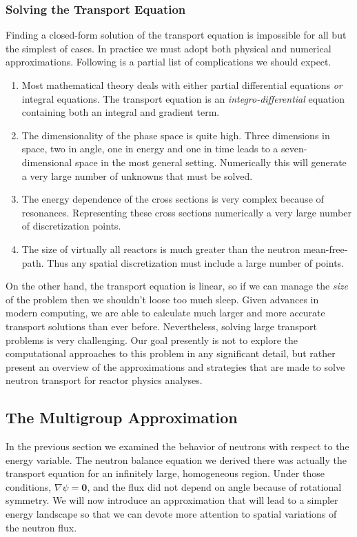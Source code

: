 \documentclass[11pt]{article}
\renewcommand\vec{\mathbf}
\begin{document}
\subsubsection{Solving the Transport Equation}
\label{sec:orgheadline50}
Finding a closed-form solution of the transport equation is impossible for all but the simplest of cases.  In practice we must adopt both physical and numerical approximations.  Following is a partial list of complications we should expect.
\begin{enumerate}
\item Most mathematical theory deals with either partial differential equations \emph{or} integral equations.  The transport equation is an \emph{integro-differential} equation containing both an integral and gradient term.
\item The dimensionality of the phase space is quite high.  Three dimensions in space, two in angle, one in energy and one in time leads to a seven-dimensional space in the most general setting.  Numerically this will generate a very large number of unknowns that must be solved.
\item The energy dependence of the cross sections is very complex because of resonances.  Representing these cross sections numerically a very large number of discretization points.
\item The size of virtually all reactors is much greater than the neutron mean-free-path.  Thus any spatial discretization must include a large number of points.
\end{enumerate}

On the other hand, the transport equation is linear, so if we can manage the \emph{size} of the problem then we shouldn't loose too much sleep.  Given advances in modern computing, we are able to calculate much larger and more accurate transport solutions than ever before.  Nevertheless, solving large transport problems is very challenging.  Our goal presently is not to explore the computational approaches to this problem in any significant detail, but rather present an overview of the approximations and strategies that are made to solve neutron transport for reactor physics analyses.

\subsection{The Multigroup Approximation}
\label{sec:orgheadline52}
In the previous section we examined the behavior of neutrons with respect to the energy variable.  The neutron balance equation we derived there was actually the transport equation for an infinitely large, homogeneous region.  Under those conditions, \(\nabla\psi = \vec{0}\), and the flux did not depend on angle because of rotational symmetry.  We will now introduce an approximation that will lead to a simpler energy landscape so that we can devote more attention to spatial variations of the neutron flux.
\end{document}
